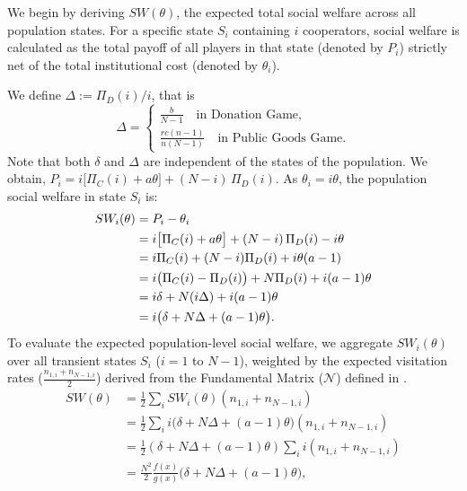 \documentclass{article}
\begin{document}
We begin by deriving $SW(\theta)$, the expected total social welfare across all population states. For a specific state $S_i$ containing $i$ cooperators, social welfare is calculated as the total payoff of all players in that state (denoted by $P_i$) strictly net of the total institutional cost (denoted by $\theta_i$).


We define $\Delta:=\Pi_D(i)/i$, that is
\begin{equation*}
\Delta=\begin{cases}
    \frac{b}{N-1}\quad \text{in Donation Game},\\
    \frac{rc(n-1)}{n(N-1)}\quad \text{in Public Goods Game}.
\end{cases}
\end{equation*}
Note that both $\delta$ and $\Delta$ are independent of the states of the population. We obtain,
$P_i = i\big[\Pi_C(i) + a\theta\big] + (N - i)\,\Pi_D(i)$. 
As $\theta_i=i\theta$, the population social welfare in state $S_i$ is:
\begin{align*}
SW_i(\theta)&= P_i - \theta_i \notag \\
 &= i\big[\Pi_C(i) + a\theta\big] + (N - i)\,\Pi_D(i) - i\theta \notag \\
 &= i\Pi_C(i) + (N - i)\Pi_D(i) + i\theta(a-1) \notag \\
 &= i\big(\Pi_C(i) - \Pi_D(i)\big) + N\Pi_D(i) + i(a-1)\theta \notag \\
 &= i\delta + N(i\Delta) + i(a-1)\theta \notag \\
 &=i\big(\delta + N\Delta + (a-1)\theta \big).
\end{align*}
To evaluate the expected population-level social welfare, we aggregate $SW_i(\theta)$ over all transient states $S_i$ ($i = 1$ to $N-1$), weighted by the expected visitation rates ($\frac{n_{1,i} + n_{N-1,i}}{2}$) derived from the Fundamental Matrix ($\mathcal{N}$) defined in \cite{duonghan2021cost}. %
\begin{align}
SW(\theta)&=\frac{1}{2}\sum_i SW_i(\theta)(n_{1,i} + n_{N-1,i})\nonumber\\
&= \frac{1}{2}\sum_{i}i\big(\delta + N\Delta+(a-1)\theta \big) 
(n_{1,i} + n_{N-1,i})\nonumber\\ 
&= \frac{1}{2}(\delta + N\Delta + (a-1)\theta) 
\sum_{i}i (n_{1,i} + n_{N-1,i})\nonumber\\
&= \frac{N^2}{2}\frac{f(x)}{g(x)} \big(\delta + N\Delta + (a-1)\theta\big),
 \label{eq:SW-theta-final}
\end{align}
\end{document}
